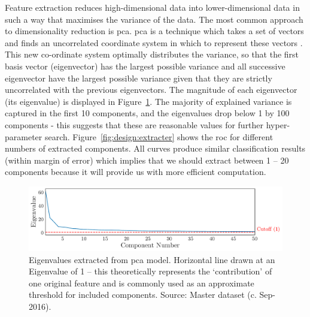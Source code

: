 \documentclass[../thesis/thesis.tex]{subfiles}
\begin{document}
Feature extraction reduces high-dimensional data into lower-dimensional data in such a way that maximises the variance of the data. The most common approach to dimensionality reduction is \gls{pca}. \Gls{pca} is a technique which takes a set of vectors and finds an uncorrelated coordinate system in which to represent these vectors \cite{jolliffe2002}. This new co-ordinate system optimally distributes the variance, so that the first basis vector (eigenvector) has the largest possible variance and all successive eigenvector have the largest possible variance given that they are strictly uncorrelated with the previous eigenvectors. The magnitude of each eigenvector (its eigenvalue) is displayed in Figure~\ref{fig:design:scree_plot}. The majority of explained variance is captured in the first 10 components, and the eigenvalues drop below 1 by 100 components - this suggests that these are reasonable values for further hyper-parameter search. Figure~\ref{fig:design:extracter} shows the \gls{roc} for different numbers of extracted components. All curves produce similar classification results (within margin of error) which implies that we should extract between 1 -- 20 components because it will provide us with more efficient computation.

\begin{figure}[!htb]
    \centering
    \includegraphics[width=\textwidth]{../figures/design/scree_plot}
    \caption[PCA scree plot]{Eigenvalues extracted from \gls{pca} model. Horizontal line drawn at an Eigenvalue of 1 -- this theoretically represents the `contribution' of one original feature and is commonly used as an approximate threshold for included components. Source: Master dataset (c. Sep-2016).}
    \label{fig:design:scree_plot}
\end{figure}
\end{document}
